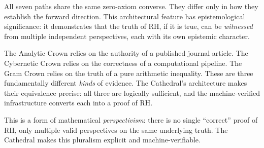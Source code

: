 All seven paths share the same zero-axiom converse. They differ
only in how they establish the forward direction. This architectural
feature has epistemological significance: it demonstrates that the
truth of RH, if it is true, can be \emph{witnessed} from multiple
independent perspectives, each with its own epistemic character.

The Analytic Crown relies on the authority of a published journal
article. The Cybernetic Crown relies on the correctness of a
computational pipeline. The Gram Crown relies on the truth of a
pure arithmetic inequality. These are three fundamentally different
\emph{kinds} of evidence. The Cathedral's architecture makes their
equivalence precise: all three are logically sufficient, and the
machine-verified infrastructure converts each into a proof of RH.

This is a form of mathematical \emph{perspectivism}: there is no
single ``correct'' proof of RH, only multiple valid perspectives
on the same underlying truth. The Cathedral makes this pluralism
explicit and machine-verifiable.
